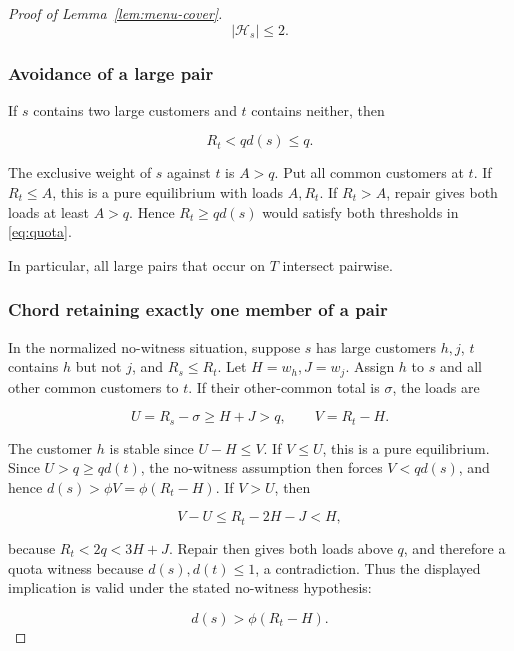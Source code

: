 \documentclass[11pt]{amsart}
\numberwithin{equation}{section}
\theoremstyle{definition}
\begin{document}
\begin{proof}[Proof of Lemma~\ref{lem:menu-cover}]
\begin{equation}
|\mathcal H_s|\le2. \label{eq:old-5-1}
\end{equation}


\subsubsection{Avoidance of a large pair}\label{avoidance-of-a-large-pair}

If \(s\) contains two large customers and \(t\) contains neither, then

\begin{equation}
R_t<qd(s)\le q. \label{eq:old-5-2}
\end{equation}

The exclusive weight of \(s\) against \(t\) is \(A>q\). Put all common customers at \(t\). If \(R_t\le A\), this is a pure equilibrium with loads \(A,R_t\). If \(R_t>A\), repair gives both loads at least \(A>q\). Hence \(R_t\ge qd(s)\) would satisfy both thresholds in \eqref{eq:quota}.

In particular, all large pairs that occur on \(T\) intersect pairwise.


\subsubsection{Chord retaining exactly one member of a pair}\label{chord-retaining-exactly-one-member-of-a-pair}

In the normalized no-witness situation, suppose \(s\) has large customers \(h,j\), \(t\) contains \(h\) but not \(j\), and \(R_s\le R_t\). Let \(H=w_h,J=w_j\). Assign \(h\) to \(s\) and all other common customers to \(t\). If their other-common total is \(\sigma\), the loads are

\[
U=R_s-\sigma\ge H+J>q,\qquad V=R_t-H.
\]

The customer \(h\) is stable since \(U-H\le V\). If \(V\le U\), this is a pure equilibrium. Since \(U>q\ge qd(t)\), the no-witness assumption then forces \(V<qd(s)\), and hence \(d(s)>\phi V=\phi(R_t-H)\). If \(V>U\), then

\[
V-U\le R_t-2H-J<H,
\]

because \(R_t<2q<3H+J\). Repair then gives both loads above \(q\), and therefore a quota witness because \(d(s),d(t)\le1\), a contradiction. Thus the displayed implication is valid under the stated no-witness hypothesis:

\begin{equation}
d(s)>\phi(R_t-H). \label{eq:old-5-3}
\end{equation}


\end{proof}
\end{document}

